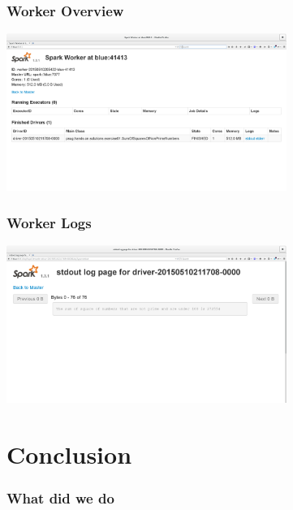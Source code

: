 \documentclass[slidetop,9pt,utf8]{beamer}
\begin{document}
\begin{CJK}{UTF8}{gbsn}
\begin{frame}
\end{frame}

\begin{frame}

  \frametitle{Worker Overview}

  \includegraphics[width=345px]{images/spark_webapp_worker_overview.png}

\end{frame}

\begin{frame}

  \frametitle{Worker Logs}

  \includegraphics[width=345px]{images/spark_webapp_worker_logs.png}

\end{frame}

\section{Conclusion}

\begin{frame}
  \frametitle{What did we do}


\end{frame}
\end{CJK}
\end{document}
